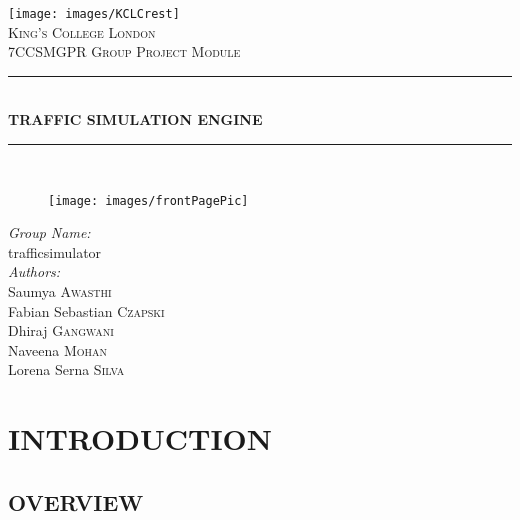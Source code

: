 \documentclass[11pt,a4paper]{article}
\newcommand{\HRule}{\rule{\linewidth}{0.5mm}}
\newcommand{\mydate}{\formatdate{26}{3}{2015}}
\begin{document}
\begin{titlepage}
	\begin{center}
		\texttt{[image: images/KCLCrest]}\\[0.5cm]
		 \textsc{\LARGE King's College London}\\	[0.8cm]
		 \textsc{\Large 7CCSMGPR Group Project Module}\\[0.3cm]
		 
		 \HRule \\[0.1cm]
		 	{\huge \bfseries TRAFFIC SIMULATION ENGINE\\[0.1cm]}
		 \HRule \\[0.8cm]

 \begin{figure}[h]
			\texttt{[image: images/frontPagePic]}
			\centering
		\end{figure}
		 
		 \noindent
		 \begin{minipage}{0.4\textwidth}
		 	\begin{center} \large
		 		\emph{Group Name:}\\
			 	\LARGE traffic\textunderscore simulator\\[0.32cm]
			 	
			 	\emph{Authors:}\\
		 		\large Saumya \textsc{Awasthi}\\
		 		\large Fabian Sebastian \textsc{Czapski}\\
		 		\large Dhiraj \textsc{Gangwani}\\
		 		\large Naveena \textsc{Mohan}\\
				\large Lorena Serna \textsc{Silva}\\
				\large \date{March 26, 2015}
		 	\end{center}	
		 \end{minipage}
		
	\vspace{4.2ex}

		 \mydate
	\end{center}
\end{titlepage}

\tableofcontents

\newpage
\section{\textbf{INTRODUCTION}}
	\subsection{OVERVIEW} 
\end{document}
